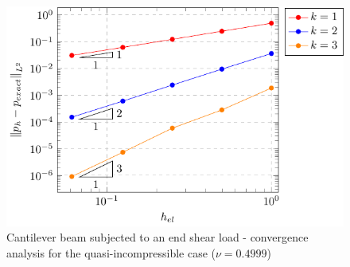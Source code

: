 \documentclass{wccm2024}
\begin{document}
\begin{figure} [!htb]
     \hfill
    \includegraphics[trim={8.5cm 0cm 0cm 0cm},clip,scale=0.75]{figs/bishop-pres-04999.pdf}
    \caption{Cantilever beam subjected to an end shear load - convergence analysis for the quasi-incompressible case ($\nu=0.4999$)}
    \label{fig:bishop-convergence-nu-04999}
\end{figure}
\end{document}
